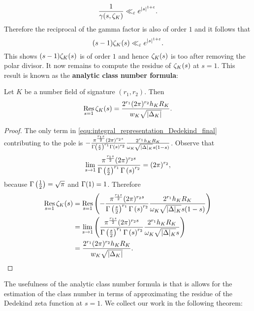       \[
        \frac{1}{\gamma(s,\zeta_{K})} \ll_{\varepsilon} e^{|s|^{1+\varepsilon}}.
      \]
      Therefore the reciprocal of the gamma factor is also of order $1$ and it follows that
      \[
        (s-1)\zeta_{K}(s) \ll_{\varepsilon} e^{|s|^{1+\varepsilon}}.
      \]
      This shows $(s-1)\zeta_{K}(s)$ is of order $1$ and hence $\zeta_{K}(s)$ is too after removing the polar divisor. It now remains to compute the residue of $\zeta_{K}(s)$ at $s = 1$. This result is known as the \textbf{analytic class number formula}:

      \begin{theorem*}
        Let $K$ be a number field of signature $(r_{1},r_{2})$. Then
        \[
          \operatorname*{\mathrm{Res}}_{s = 1}\zeta_{K}(s) = \frac{2^{r_{1}}(2\pi)^{r_{2}}h_{K}R_{K}}{w_{K}\sqrt{|\Delta_{K}|}}.
        \]
      \end{theorem*}
      \begin{proof}
        The only term in \cref{equ:integral_representation_Dedekind_final} contributing to the pole is $-\frac{\pi^{\frac{r_{1}s}{2}}(2\pi)^{r_{2}s}}{\Gamma\left(\frac{s}{2}\right)^{r_{1}}\Gamma\left(s\right)^{r_{2}}}\frac{2^{r_{1}}h_{K}R_{K}}{\omega_{K}\sqrt{|\Delta|_{K}}s(1-s)}$. Observe that
        \[
          \lim_{s \to 1}\frac{\pi^{\frac{r_{1}s}{2}}(2\pi)^{r_{2}s}}{\Gamma\left(\frac{s}{2}\right)^{r_{1}}\Gamma\left(s\right)^{r_{2}}} = (2\pi)^{r_{2}},
        \]
        because $\Gamma\left(\frac{1}{2}\right) = \sqrt{\pi}$ and $\Gamma(1) = 1$. Therefore
        \begin{align*}
          \operatorname*{\mathrm{Res}}_{s = 1}\zeta_{K}(s) &= \operatorname*{\mathrm{Res}}_{s = 1}\left(-\frac{\pi^{\frac{r_{1}s}{2}}(2\pi)^{r_{2}s}}{\Gamma\left(\frac{s}{2}\right)^{r_{1}}\Gamma\left(s\right)^{r_{2}}}\frac{2^{r_{1}}h_{K}R_{K}}{\omega_{K}\sqrt{|\Delta|_{K}}s(1-s)}\right) \\
          &= \lim_{s \to 1}\left(\frac{\pi^{\frac{r_{1}s}{2}}(2\pi)^{r_{2}s}}{\Gamma\left(\frac{s}{2}\right)^{r_{1}}\Gamma\left(s\right)^{r_{2}}}\frac{2^{r_{1}}h_{K}R_{K}}{\omega_{K}\sqrt{|\Delta|_{K}}s}\right) \\
          &= \frac{2^{r_{1}}(2\pi)^{r_{2}}h_{K}R_{K}}{w_{K}\sqrt{|\Delta_{K}|}}.
        \end{align*}
      \end{proof}

      The usefulness of the analytic class number formula is that is allows for the estimation of the class number in terms of approximating the residue of the Dedekind zeta function at $s = 1$. We collect our work in the following theorem:

